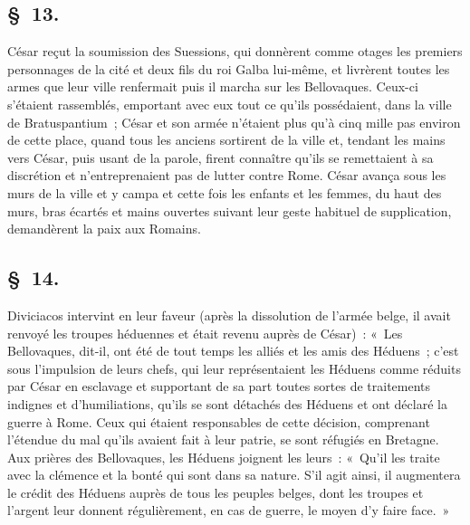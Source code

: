 \documentclass[french,twoside]{book} %
\begin{document}
\subsection[{§ 13.}]{ \textsc{§ 13.} }
\noindent César reçut la soumission des Suessions, qui donnèrent comme otages les premiers personnages de la cité et deux fils du roi Galba lui-même, et livrèrent toutes les armes que leur ville renfermait puis il marcha sur les Bellovaques. Ceux-ci s’étaient rassemblés, emportant avec eux tout ce qu’ils possédaient, dans la ville de Bratuspantium ; César et son armée n’étaient plus qu’à cinq mille pas environ de cette place, quand tous les anciens sortirent de la ville et, tendant les mains vers César, puis usant de la parole, firent connaître qu’ils se remettaient à sa discrétion et n’entreprenaient pas de lutter contre Rome. César avança sous les murs de la ville et y campa et cette fois les enfants et les femmes, du haut des murs, bras écartés et mains ouvertes suivant leur geste habituel de supplication, demandèrent la paix aux Romains.
\subsection[{§ 14.}]{ \textsc{§ 14.} }
\noindent Diviciacos intervint en leur faveur (après la dissolution de l’armée belge, il avait renvoyé les troupes héduennes et était revenu auprès de César) : « Les Bellovaques, dit-il, ont été de tout temps les alliés et les amis des Héduens ; c’est sous l’impulsion de leurs chefs, qui leur représentaient les Héduens comme réduits par César en esclavage et supportant de sa part toutes sortes de traitements indignes et d’humiliations, qu’ils se sont détachés des Héduens et ont déclaré la guerre à Rome. Ceux qui étaient responsables de cette décision, comprenant l’étendue du mal qu’ils avaient fait à leur patrie, se sont réfugiés en Bretagne. Aux prières des Bellovaques, les Héduens joignent les leurs : « Qu'il les traite avec la clémence et la bonté qui sont dans sa nature. S'il agit ainsi, il augmentera le crédit des Héduens auprès de tous les peuples belges, dont les troupes et l’argent leur donnent régulièrement, en cas de guerre, le moyen d’y faire face. »
\end{document}
